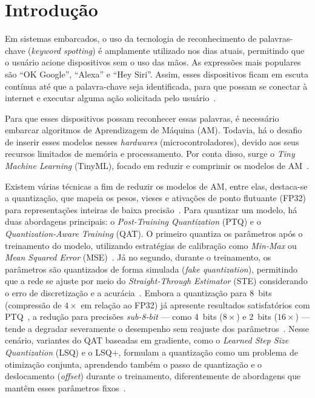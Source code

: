 \section{Introdução}

Em sistemas embarcados, o uso da tecnologia de reconhecimento de palavras-chave (\textit{keyword spotting}) é amplamente utilizado nos dias atuais, permitindo que o usuário acione dispositivos sem o uso das mãos. As expressões mais populares são ``OK Google'', ``Alexa'' e ``Hey Siri''. Assim, esses dispositivos ficam em escuta contínua até que a palavra-chave seja identificada, para que possam se conectar à internet e executar alguma ação solicitada pelo usuário~\cite{carlos2025}.

Para que esses dispositivos possam reconhecer essas palavras, é necessário embarcar algoritmos de Aprendizagem de Máquina (AM). Todavia, há o desafio de inserir esses modelos nesses \textit{hardwares} (microcontroladores), devido aos seus recursos limitados de memória e processamento. Por conta disso, surge o \textit{Tiny Machine Learning} (TinyML), focado em reduzir e comprimir os modelos de AM~\cite{carlos2025,pereira2023}.

Existem várias técnicas a fim de reduzir os modelos de AM, entre elas, destaca-se a quantização, que mapeia os pesos, vieses e ativações de ponto flutuante (FP32) para representações inteiras de baixa precisão~\cite{ravaglia2021,zhao2021}. Para quantizar um modelo, há duas abordagens principais: o \textit{Post-Training Quantization} (PTQ) e o \textit{Quantization-Aware Training} (QAT). O primeiro quantiza os parâmetros após o treinamento do modelo, utilizando estratégias de calibração como \textit{Min-Max} ou \textit{Mean Squared Error} (MSE)~\cite{zhao2021}. Já no segundo, durante o treinamento, os parâmetros são quantizados de forma simulada (\textit{fake quantization}), permitindo que a rede se ajuste por meio do \textit{Straight-Through Estimator} (STE) considerando o erro de discretização e a acurácia~\cite{bhalgat2020,lin2023}. Embora a quantização para 8~bits (compressão de $4\times$ em relação ao FP32) já apresente resultados satisfatórios com PTQ~\cite{carlos2025,ravaglia2021}, a redução para precisões \textit{sub-8-bit} --- como 4~bits ($8\times$) e 2~bits ($16\times$) --- tende a degradar severamente o desempenho sem reajuste dos parâmetros~\cite{bhalgat2020,lin2023}. Nesse cenário, variantes do QAT baseadas em gradiente, como o \textit{Learned Step Size Quantization} (LSQ) e o LSQ+, formulam a quantização como um problema de otimização conjunta, aprendendo também o passo de quantização e o deslocamento (\textit{offset}) durante o treinamento, diferentemente de abordagens que mantêm esses parâmetros fixos~\cite{bhalgat2020}.

